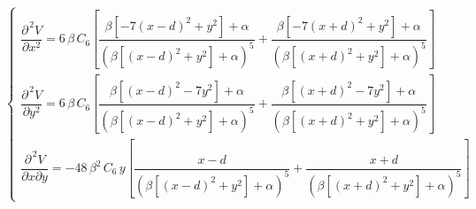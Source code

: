 \documentclass[10pt,aps,onecolumn,superscriptaddress]{revtex4-2}
\begin{document}
\begin{equation}
\begin{cases}
\dfrac{\partial^{\,	2} V}{\partial x^2} = 6 \, \beta \, C_6 \left[\dfrac{\beta\left[-7\left(x - d\right)^2 + y^2\right] + \alpha}{\left(\beta\left[\left(x - d\right)^2 + y^2\right] + \alpha\right)^5} + \dfrac{\beta\left[-7\left(x + d\right)^2 + y^2\right] + \alpha}{\left(\beta\left[\left(x + d\right)^2 + y^2\right] + \alpha\right)^5} \right] \\[.8cm]

\dfrac{\partial^{\,	2} V}{\partial y^2} = 6 \, \beta \, C_6 \left[\dfrac{\beta\left[\left(x - d\right)^2 - 7 y^2\right] + \alpha}{\left(\beta\left[\left(x - d\right)^2 + y^2\right] + \alpha\right)^5} + \dfrac{\beta\left[\left(x + d\right)^2 - 7y^2\right] + \alpha}{\left(\beta\left[\left(x + d\right)^2 + y^2\right] + \alpha\right)^5} \right] \\[.8cm]

\dfrac{\partial^{\,	2} V}{\partial x \partial y} = - 48 \, \beta^2 \, C_6 \, y \left[\dfrac{x - d}{\left(\beta\left[\left(x - d\right)^2 + y^2\right] + \alpha\right)^5} + \dfrac{x + d}{\left(\beta\left[\left(x + d\right)^2 + y^2\right] + \alpha\right)^5}\right]
\end{cases}
\label{eq:second_pder}
\end{equation}

\newpage


\end{document}
